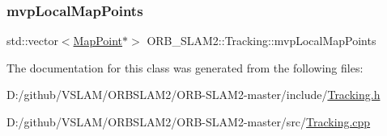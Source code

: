\mbox{\label{class_o_r_b___s_l_a_m2_1_1_tracking_a89074acc520094ba0d0fc7f4c0f8cf09}} 
\subsubsection{\texorpdfstring{mvp\+Local\+Map\+Points}{mvpLocalMapPoints}}
{\footnotesize\ttfamily std\+::vector$<$\mbox{\hyperlink{class_o_r_b___s_l_a_m2_1_1_map_point}{Map\+Point}}$\ast$$>$ O\+R\+B\+\_\+\+S\+L\+A\+M2\+::\+Tracking\+::mvp\+Local\+Map\+Points\hspace{0.3cm}{\ttfamily [protected]}}



The documentation for this class was generated from the following files\+:\begin{DoxyCompactItemize}
\item 
D\+:/github/\+V\+S\+L\+A\+M/\+O\+R\+B\+S\+L\+A\+M2/\+O\+R\+B-\/\+S\+L\+A\+M2-\/master/include/\mbox{\hyperlink{_tracking_8h}{Tracking.\+h}}\item 
D\+:/github/\+V\+S\+L\+A\+M/\+O\+R\+B\+S\+L\+A\+M2/\+O\+R\+B-\/\+S\+L\+A\+M2-\/master/src/\mbox{\hyperlink{_tracking_8cpp}{Tracking.\+cpp}}\end{DoxyCompactItemize}
